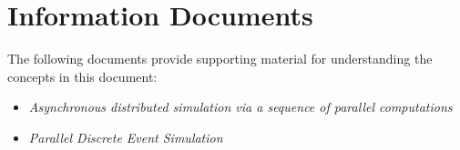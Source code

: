 \section{Information Documents}
The following documents provide supporting material for understanding the
concepts in this document:

\begin{itemize}
\item{\em Asynchronous distributed simulation via a sequence of parallel computations} 
\cite{art:chandy-misra}
\item{\em Parallel Discrete Event Simulation} 
\cite{art:fujimoto-acm}
\end{itemize}
